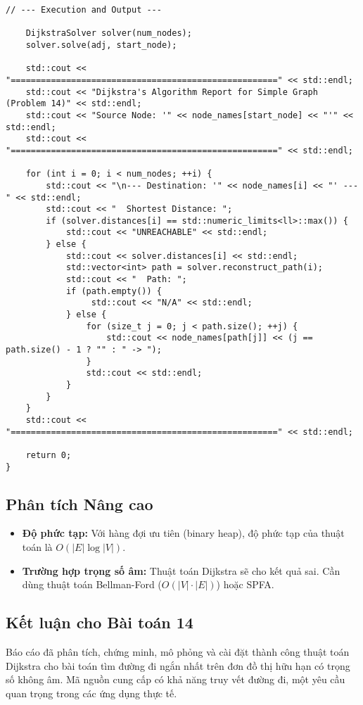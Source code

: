 \documentclass[a4paper,12pt]{article}
\begin{document}
\begin{lstlisting}[style=cppstyle, caption={Cài đặt Dijkstra bằng C++ sử dụng lớp và truy vết.}, label={lst:cpp}]
    // --- Execution and Output ---
    
    DijkstraSolver solver(num_nodes);
    solver.solve(adj, start_node);

    std::cout << "=====================================================" << std::endl;
    std::cout << "Dijkstra's Algorithm Report for Simple Graph (Problem 14)" << std::endl;
    std::cout << "Source Node: '" << node_names[start_node] << "'" << std::endl;
    std::cout << "=====================================================" << std::endl;

    for (int i = 0; i < num_nodes; ++i) {
        std::cout << "\n--- Destination: '" << node_names[i] << "' ---" << std::endl;
        std::cout << "  Shortest Distance: ";
        if (solver.distances[i] == std::numeric_limits<ll>::max()) {
            std::cout << "UNREACHABLE" << std::endl;
        } else {
            std::cout << solver.distances[i] << std::endl;
            std::vector<int> path = solver.reconstruct_path(i);
            std::cout << "  Path: ";
            if (path.empty()) {
                 std::cout << "N/A" << std::endl;
            } else {
                for (size_t j = 0; j < path.size(); ++j) {
                    std::cout << node_names[path[j]] << (j == path.size() - 1 ? "" : " -> ");
                }
                std::cout << std::endl;
            }
        }
    }
    std::cout << "=====================================================" << std::endl;

    return 0;
}
\end{lstlisting}

\subsection{Phân tích Nâng cao}
\begin{itemize}
    \item \textbf{Độ phức tạp:} Với hàng đợi ưu tiên (binary heap), độ phức tạp của thuật toán là $O(|E| \log |V|)$.
    \item \textbf{Trường hợp trọng số âm:} Thuật toán Dijkstra sẽ cho kết quả sai. Cần dùng thuật toán Bellman-Ford ($O(|V| \cdot |E|)$) hoặc SPFA.
\end{itemize}

\subsection{Kết luận cho Bài toán 14}
Báo cáo đã phân tích, chứng minh, mô phỏng và cài đặt thành công thuật toán Dijkstra cho bài toán tìm đường đi ngắn nhất trên đơn đồ thị hữu hạn có trọng số không âm. Mã nguồn cung cấp có khả năng truy vết đường đi, một yêu cầu quan trọng trong các ứng dụng thực tế.
\end{document}
